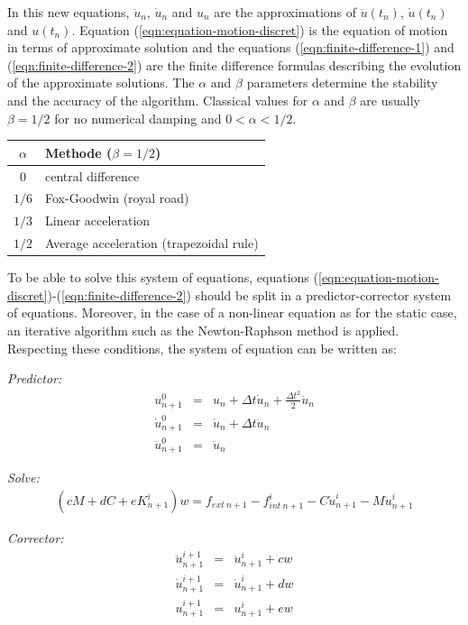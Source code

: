 \documentclass[a4paper,11pt]{book}
\begin{document}
In   this  new   equations,  $\ddot{u}_n$,   $\dot{u}_n$  and   $u_n$   are  the
approximations  of  $\ddot{u}(t_n)$,   $\dot{u}(t_n)$  and  $u(t_n)$.   Equation
(\ref{eqn:equation-motion-discret})  is  the  equation  of motion  in  terms  of
approximate  solution  and  the  equations  (\ref{eqn:finite-difference-1})  and
(\ref{eqn:finite-difference-2})  are the  finite difference  formulas describing
the evolution of the approximate solutions.  The $\alpha$ and $\beta$ parameters
determine the stability and the  accuracy of the algorithm. Classical values for
$\alpha$ and $\beta$ are usually $\beta = 1/2$ for no numerical damping and $0 <
\alpha < 1/2$.

\begin{center}
  \begin{tabular}{c|l}
    $\alpha$ & Methode ($\beta = 1/2$)\\
    \hline
    $0$ & central difference\\
    $1/6$ & Fox-Goodwin (royal road)\\
    $1/3$ & Linear acceleration\\
    $1/2$ & Average acceleration (trapezoidal rule)
  \end{tabular}
\end{center}

To    be    able   to    solve    this    system    of   equations,    equations
(\ref{eqn:equation-motion-discret})-(\ref{eqn:finite-difference-2})   should  be
split in a predictor-corrector system of  equations.  Moreover, in the case of a
non-linear equation as  for the static case, an iterative  algorithm such as the
Newton-Raphson method  is applied.  Respecting  these conditions, the  system of
equation can be written as:

\noindent\textit{Predictor:}
\begin{eqnarray}
  u^{0}_{n+1} &=& u_{n}  + \Delta t \dot{u}_n +  \frac{\Delta t^2}{2} \ddot{u}_n
  \\
  \dot{u}^{0}_{n+1}  &=& \dot{u}_{n} +  \Delta t \ddot{u}_{n} \\
  \ddot{u}^{0}_{n+1} &=& \ddot{u}_{n}
\end{eqnarray}

\noindent\textit{Solve:}
\begin{eqnarray}
 (c M + d C + e K^i_{n+1}) w = f_{ext~n+1} - f^i_{int~n+1} - C \dot{u}^i_{n+1} -
 M \ddot{u}^i_{n+1}
\end{eqnarray}

\noindent\textit{Corrector:}
\begin{eqnarray}
  \ddot{u}^{i+1}_{n+1} &=& \ddot{u}^{i}_{n+1} + c w \\
  \dot{u}^{i+1}_{n+1} &=& \dot{u}^{i}_{n+1} + d w \\
  u^{i+1}_{n+1} &=& u^{i}_{n+1} + e w
\end{eqnarray}
\end{document}
